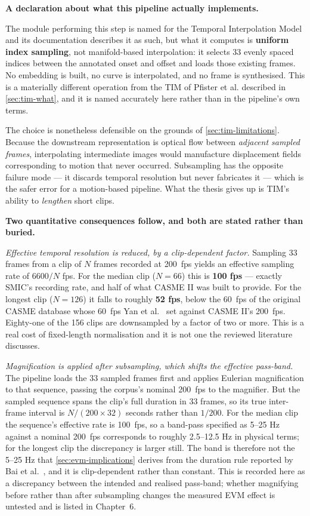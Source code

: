 \textbf{A declaration about what this pipeline actually implements.}

The module performing this step is named for the Temporal Interpolation Model and its documentation describes it as such, but what it computes is \textbf{uniform index sampling}, not manifold-based interpolation: it selects 33 evenly spaced indices between the annotated onset and offset and loads those existing frames. No embedding is built, no curve is interpolated, and no frame is synthesised. This is a materially different operation from the TIM of Pfister et al. described in \autoref{sec:tim-what}, and it is named accurately here rather than in the pipeline's own terms.

The choice is nonetheless defensible on the grounds of \autoref{sec:tim-limitations}. Because the downstream representation is optical flow between \textit{adjacent sampled frames}, interpolating intermediate images would manufacture displacement fields corresponding to motion that never occurred. Subsampling has the opposite failure mode --- it discards temporal resolution but never fabricates it --- which is the safer error for a motion-based pipeline. What the thesis gives up is TIM's ability to \textit{lengthen} short clips.

\textbf{Two quantitative consequences follow, and both are stated rather than buried.}

\textit{Effective temporal resolution is reduced, by a clip-dependent factor.} Sampling 33 frames from a clip of $N$ frames recorded at 200~fps yields an effective sampling rate of $6600/N$ fps. For the median clip ($N = 66$) this is \textbf{100 fps} --- exactly SMIC's recording rate, and half of what CASME II was built to provide. For the longest clip ($N = 126$) it falls to roughly \textbf{52 fps}, below the 60~fps of the original CASME database whose 60~fps Yan et al.~\cite{yan2014} set against CASME II's 200~fps. Eighty-one of the 156 clips are downsampled by a factor of two or more. This is a real cost of fixed-length normalisation and it is not one the reviewed literature discusses.

\textit{Magnification is applied after subsampling, which shifts the effective pass-band.} The pipeline loads the 33 sampled frames first and applies Eulerian magnification to that sequence, passing the corpus's nominal 200~fps to the magnifier. But the sampled sequence spans the clip's full duration in 33 frames, so its true inter-frame interval is $N/(200 \times 32)$ seconds rather than $1/200$. For the median clip the sequence's effective rate is 100~fps, so a band-pass specified as 5--25 Hz against a nominal 200~fps corresponds to roughly 2.5--12.5 Hz in physical terms; for the longest clip the discrepancy is larger still. The band is therefore not the 5--25 Hz that \autoref{sec:evm-implications} derives from the duration rule reported by Bai et al.~\cite{bai2021}, and it is clip-dependent rather than constant. This is recorded here as a discrepancy between the intended and realised pass-band; whether magnifying before rather than after subsampling changes the measured EVM effect is untested and is listed in Chapter~6.

